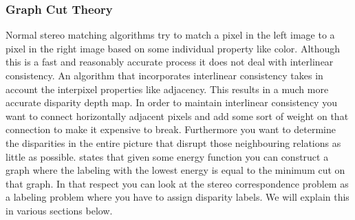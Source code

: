 \documentclass[a4paper]{article}
\begin{document}
\subsubsection{Graph Cut Theory}
\label{gc_theory}
Normal stereo matching algorithms try to match a pixel in the left image to a
pixel in the right image based on some individual property like color. Although
this is a fast and reasonably accurate process it does not deal with interlinear
consistency. An algorithm that incorporates interlinear consistency takes in
account the interpixel properties like adjacency. This results in a much more
accurate disparity depth map.  In order to maintain interlinear consistency you
want to connect horizontally adjacent pixels and add some sort of weight on that
connection to make it expensive to break. Furthermore you want to determine the
disparities in the entire picture that disrupt those neighbouring relations as
little as possible. \cite{zabih2001} states that given some energy function
you can construct a graph where the labeling with the lowest energy is equal to
the minimum cut on that graph. In that respect you can look at the stereo
correspondence problem as a labeling problem where you have to assign disparity
labels.  We will explain this in various sections below.\\\\
\end{document}
